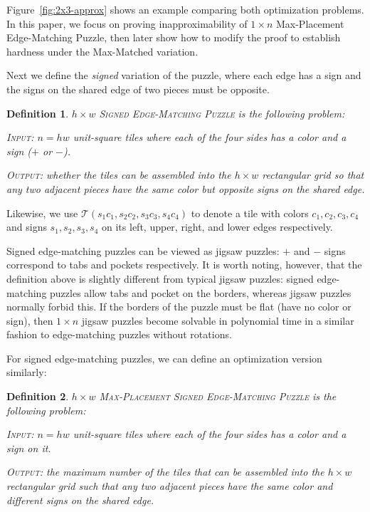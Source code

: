 \documentclass[11pt]{article}
\newtheorem{definition}{Definition}
\begin{document}
Figure~\ref{fig:2x3-approx} shows an example comparing both optimization problems.
In this paper, we focus on proving inapproximability of $1 \times n$ Max-Placement Edge-Matching Puzzle, then later show how to modify the proof to establish hardness under the Max-Matched variation.


Next we define the \emph{signed} variation of the puzzle, where each edge has a sign and the signs on the shared edge of two pieces must be opposite.

\begin{definition}
	\textsc{$h \times w$ Signed Edge-Matching Puzzle} is the following problem:

	\textsc{Input:} $n = h w$ unit-square tiles where each of the four sides has a color and a sign ($+$ or $-$).

	\textsc{Output:} whether the tiles can be assembled into the $h \times w$ rectangular grid so that any two adjacent pieces have the same color but opposite signs on the shared edge.
\end{definition}

Likewise, we use $\mathcal{T}(s_1c_1, s_2c_2, s_3c_3, s_4c_4)$ to denote a tile with colors $c_1, c_2, c_3, c_4$ and signs $s_1, s_2, s_3, s_4$ on its left, upper, right, and lower edges respectively.

Signed edge-matching puzzles can be viewed as jigsaw puzzles: $+$ and $-$ signs correspond to tabs and pockets respectively. It is worth noting, however, that the definition above is slightly different from typical jigsaw puzzles: signed edge-matching puzzles allow tabs and pocket on the borders, whereas jigsaw puzzles normally forbid this. If the borders of the puzzle must be flat (have no color or sign), then $1 \times n$ jigsaw puzzles become solvable in polynomial time in a similar fashion to edge-matching puzzles without rotations.

For signed edge-matching puzzles, we can define an optimization version similarly:
\begin{definition}
	\textsc{$h \times w$ Max-Placement Signed Edge-Matching Puzzle} is the following problem:

	\textsc{Input:} $n = h w$ unit-square tiles where each of the four sides has a color and a sign on it.

	\textsc{Output:} the maximum number of the tiles that can be assembled into the $h \times w$ rectangular grid such that any two adjacent pieces have the same color and different signs on the shared edge.
\end{definition}
\end{document}
